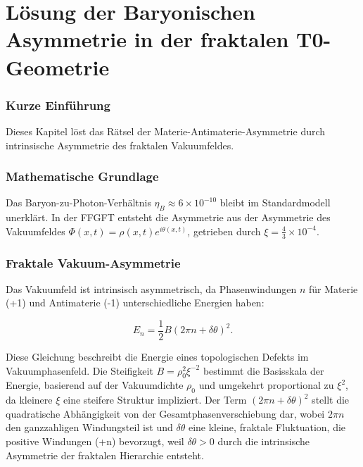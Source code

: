 \chapter{Lösung der Baryonischen Asymmetrie in der fraktalen T0-Geometrie}


	
	\subsection*{Kurze Einführung}
	
	Dieses Kapitel löst das Rätsel der Materie-Antimaterie-Asymmetrie durch intrinsische Asymmetrie des fraktalen Vakuumfeldes.
	
	\subsection*{Mathematische Grundlage}
	
	Das Baryon-zu-Photon-Verhältnis \(\eta_B \approx 6 \times 10^{-10}\) bleibt im Standardmodell unerklärt. In der FFGFT entsteht die Asymmetrie aus der Asymmetrie des Vakuumfeldes \(\Phi(x,t) = \rho(x,t) e^{i\theta(x,t)}\), getrieben durch \(\xi = \frac{4}{3} \times 10^{-4}\).
	

	
	\subsection*{Fraktale Vakuum-Asymmetrie}
	
	Das Vakuumfeld ist intrinsisch asymmetrisch, da Phasenwindungen \(n\) für Materie (+1) und Antimaterie (-1) unterschiedliche Energien haben:
	
	\begin{equation}
		E_n = \frac{1}{2} B (2\pi n + \delta \theta)^2.
	\end{equation}
	
	Diese Gleichung beschreibt die Energie eines topologischen Defekts im Vakuumphasenfeld. Die Steifigkeit \(B = \rho_0^2 \xi^{-2}\) bestimmt die Basisskala der Energie, basierend auf der Vakuumdichte \(\rho_0\) und umgekehrt proportional zu \(\xi^2\), da kleinere \(\xi\) eine steifere Struktur impliziert. Der Term \((2\pi n + \delta \theta)^2\) stellt die quadratische Abhängigkeit von der Gesamtphasenverschiebung dar, wobei \(2\pi n\) den ganzzahligen Windungsteil ist und \(\delta \theta\) eine kleine, fraktale Fluktuation, die positive Windungen (+n) bevorzugt, weil \(\delta \theta > 0\) durch die intrinsische Asymmetrie der fraktalen Hierarchie entsteht.
	
